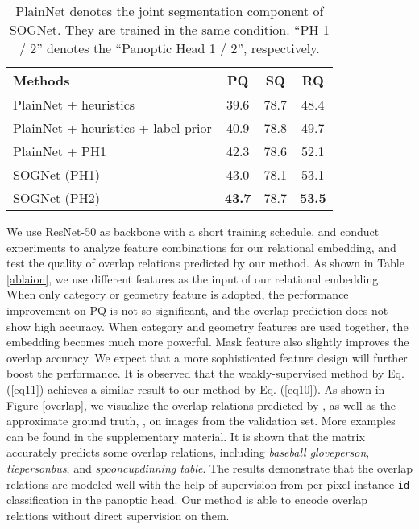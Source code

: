 \documentclass[letterpaper]{article} \usepackage{aaai20}  \usepackage{times}  \usepackage{helvet} \usepackage{courier}  \usepackage[hyphens]{url}  \usepackage{graphicx} \urlstyle{rm} \def\UrlFont{\rm}  \usepackage{graphicx}  \frenchspacing  \setlength{\pdfpagewidth}{8.5in}  \setlength{\pdfpageheight}{11in}
\begin{document}
\begin{table}[!t]
	\renewcommand\arraystretch{1.1}
	\centering
\begin{tabular}{l|ccc}
		\hline
		Methods & PQ & SQ & RQ \\
		\hline
		PlainNet + heuristics & 39.6 & 78.7 & 48.4 \\
		PlainNet + heuristics + label prior & 40.9 & 78.8 & 49.7 \\
		PlainNet + PH1 & 42.3 & 78.6 & 52.1 \\
		SOGNet (PH1) & 43.0 & 78.1 & 53.1 \\
		SOGNet (PH2) & \textbf{43.7} & 78.7 & \textbf{53.5} \\
		\hline
	\end{tabular}
\caption{PlainNet denotes the joint segmentation component of SOGNet. They are trained in the same condition. ``PH 1 / 2'' denotes the ``Panoptic Head 1 / 2'', respectively.}
	\label{ablaion2}
	\vspace{-1mm}
\end{table}

We use ResNet-50 as backbone with a short training schedule, and conduct experiments to analyze feature combinations for our relational embedding, and test the quality of overlap relations predicted by our method. As shown in Table \ref{ablaion}, we use different features as the input of our relational embedding. When only category or geometry feature is adopted, the performance improvement on PQ is not so significant, and the overlap prediction does not show high accuracy. When category and geometry features are used together, the embedding becomes much more powerful. Mask feature also slightly improves the overlap accuracy. We expect that a more sophisticated feature design will further boost the performance.  It is observed that the weakly-supervised method by Eq. (\ref{eq11}) achieves a similar result to our method by Eq. (\ref{eq10}). As shown in Figure \ref{overlap}, we visualize the overlap relations predicted by , as well as the approximate ground truth, , on images from the validation set. More examples can be found in the supplementary material. It is shown that the matrix  accurately predicts some overlap relations, including \emph{baseball glove}\emph{person}, \emph{tie}\emph{person}\emph{bus}, and \emph{spoon}\emph{cup}\emph{dinning table}. The results demonstrate that the overlap relations are modeled well with the help of supervision from per-pixel instance \verb|id| classification in the panoptic head. Our method is able to encode overlap relations without direct supervision on them. 
\end{document}
